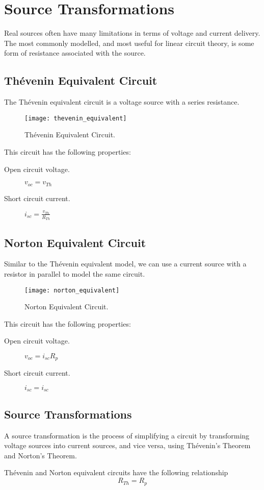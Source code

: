 \documentclass{article}
\begin{document}
\section{Source Transformations}
Real sources often have many limitations in terms of voltage and current delivery.
The most commonly modelled, and most useful for linear circuit theory, is some form of 
resistance associated with the source.
\subsection{Thévenin Equivalent Circuit}
\begin{definition}
    The Thévenin equivalent circuit is a voltage source with a series resistance.
    \begin{figure}[H]
        \centering
        \texttt{[image: thevenin\_equivalent]}
        \caption{Thévenin Equivalent Circuit.}
    \end{figure}
    This circuit has the following properties:
    \begin{description}
        \item[Open circuit voltage.] $v_{oc} = v_{Th}$
        \item[Short circuit current.] $i_{sc} = \frac{v_{Th}}{R_{Th}}$
    \end{description}
\end{definition}
\subsection{Norton Equivalent Circuit}
\begin{definition}
    Similar to the Thévenin equivalent model, we can use a current source with 
    a resistor in parallel to model the same circuit.
    \begin{figure}[H]
        \centering
        \texttt{[image: norton\_equivalent]}
        \caption{Norton Equivalent Circuit.}
    \end{figure}
    This circuit has the following properties:
    \begin{description}
        \item[Open circuit voltage.] $v_{oc} = i_{sc}R_{p}$
        \item[Short circuit current.] $i_{sc} = i_{sc}$ 
    \end{description}
\end{definition}
\subsection{Source Transformations}
A source transformation is the process of simplifying a circuit by transforming 
voltage sources into current sources, and vice versa, using Thévenin's Theorem and Norton's 
Theorem.
\begin{theorem}
    Thévenin and Norton equivalent circuits have the following relationship
    \begin{equation*}
        R_{Th} = R_{p}
    \end{equation*}
\end{theorem}
\end{document}
